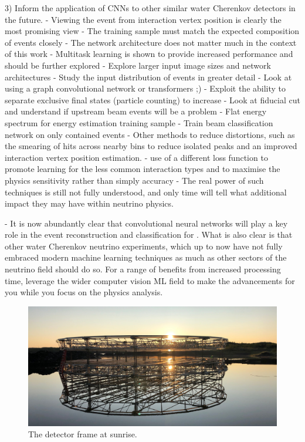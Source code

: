 3) Inform the application of CNNs to other similar water Cherenkov detectors in the future. 
    - Viewing the event from interaction vertex position is clearly the most promising view
    - The training sample must match the expected composition of events closely
    - The network architecture does not matter much in the context of this work
    - Multitask learning is shown to provide increased performance and should be further explored
    - Explore larger input image sizes and network architectures
    - Study the input distribution of events in greater detail
    - Look at using a graph convolutional network or transformers ;)
    - Exploit the ability to separate exclusive final states (particle counting) to increase 
    - Look at fiducial cut and understand if upstream beam events will be a problem
    - Flat energy spectrum for energy estimation training sample
    - Train beam classification network on only contained events
    - Other methods to reduce distortions, such as the smearing of hits across nearby bins to   
    reduce isolated peaks and an improved interaction vertex position estimation.
    - use of a different loss function to promote learning for the less common interaction types 
    and to maximise the physics sensitivity rather than simply accuracy
    - The real power of such techniques is still not fully understood, and only time will tell
    what additional impact they may have within neutrino physics.

- It is now abundantly clear that convolutional neural networks will play a key role in the event
reconstruction and classification for \chips. What is also clear is that other water Cherenkov
neutrino experiments, which up to now have not fully embraced modern machine learning techniques
as much as other sectors of the neutrino field should do so. For a range of benefits from
increased processing time, leverage the wider computer vision ML field to make the advancements
for you while you focus on the physics analysis.

\begin{figure} %
    \includegraphics[width=\textwidth]{diagrams/4-chips/sunrise.pdf}
    \caption*{The \chipsfive detector frame at sunrise.}
\end{figure}
